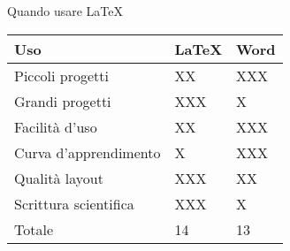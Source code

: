 \begin{frame}{Quando usare \LaTeX}
	\begin{table}[H]
		\centering
		\begin{tabular}{lll}
			\hline
			\textbf{Uso}          & \textbf{\LaTeX{}} & \textbf{Word} \\
			\hline
			Piccoli progetti      & XX    & XXX  \\
			Grandi progetti       & XXX   & X    \\
			Facilità d'uso        & XX    & XXX  \\
			Curva d'apprendimento & X     & XXX  \\
			Qualità layout        & XXX   & XX   \\
			Scrittura scientifica & XXX   & X    \\
			\hline
			Totale                & 14    & 13   \\
			\hline
		\end{tabular}
	\end{table}
\end{frame}